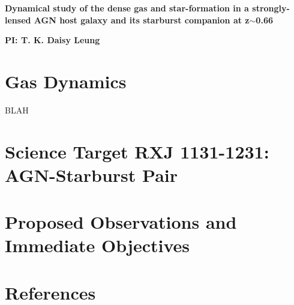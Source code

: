 \documentclass[12pt,a4paper]{article}  %
\begin{document}
\pagestyle{plain}
 

\begin{center}
{\LARGE{\bf
{ 
Dynamical study of the dense gas and star-formation in a strongly-lensed
AGN host galaxy and its starburst companion at z$\sim$0.66}
}}
\end{center}
\centerline{\bf PI: 
{T. K. Daisy Leung}} 


\section{Gas Dynamics}
\vspace{-0.25em}

\indent BLAH
 
\section{Science Target RXJ 1131-1231: AGN-Starburst Pair}
\vspace{-0.25em}


\section{Proposed Observations and Immediate Objectives}
\vspace{-0.25em}


\section*{References}
{\fontsize{10pt}{12pt}\selectfont
	
}

\end{document}

